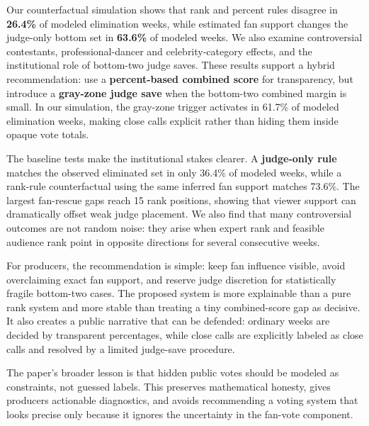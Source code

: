 \documentclass[12pt]{article}
\begin{document}
\noindent
Our counterfactual simulation shows that rank and percent rules disagree in \textbf{26.4\%} of modeled elimination weeks, while estimated fan support changes the judge-only bottom set in \textbf{63.6\%} of modeled weeks. We also examine controversial contestants, professional-dancer and celebrity-category effects, and the institutional role of bottom-two judge saves. These results support a hybrid recommendation: use a \textbf{percent-based combined score} for transparency, but introduce a \textbf{gray-zone judge save} when the bottom-two combined margin is small. In our simulation, the gray-zone trigger activates in 61.7\% of modeled elimination weeks, making close calls explicit rather than hiding them inside opaque vote totals.

\noindent
The baseline tests make the institutional stakes clearer. A \textbf{judge-only rule} matches the observed eliminated set in only 36.4\% of modeled weeks, while a rank-rule counterfactual using the same inferred fan support matches 73.6\%. The largest fan-rescue gaps reach 15 rank positions, showing that viewer support can dramatically offset weak judge placement. We also find that many controversial outcomes are not random noise: they arise when expert rank and feasible audience rank point in opposite directions for several consecutive weeks.

\noindent
For producers, the recommendation is simple: keep fan influence visible, avoid overclaiming exact fan support, and reserve judge discretion for statistically fragile bottom-two cases. The proposed system is more explainable than a pure rank system and more stable than treating a tiny combined-score gap as decisive. It also creates a public narrative that can be defended: ordinary weeks are decided by transparent percentages, while close calls are explicitly labeled as close calls and resolved by a limited judge-save procedure.

\noindent
The paper's broader lesson is that hidden public votes should be modeled as constraints, not guessed labels. This preserves mathematical honesty, gives producers actionable diagnostics, and avoids recommending a voting system that looks precise only because it ignores the uncertainty in the fan-vote component.

\clearpage
\pagestyle{fancy}
\setcounter{page}{1}

{\small
\renewcommand{\baselinestretch}{0.94}\selectfont
\tableofcontents
}
\clearpage
\end{document}
